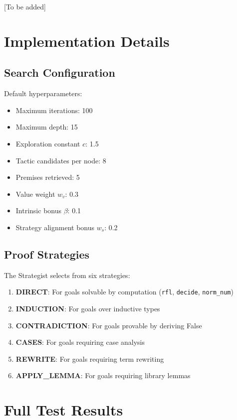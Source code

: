 \documentclass[11pt]{article}
\begin{document}
[To be added]

\appendix

\section{Implementation Details}

\subsection{Search Configuration}

Default hyperparameters:
\begin{itemize}
    \item Maximum iterations: 100
    \item Maximum depth: 15
    \item Exploration constant $c$: 1.5
    \item Tactic candidates per node: 8
    \item Premises retrieved: 5
    \item Value weight $w_v$: 0.3
    \item Intrinsic bonus $\beta$: 0.1
    \item Strategy alignment bonus $w_s$: 0.2
\end{itemize}

\subsection{Proof Strategies}

The Strategist selects from six strategies:
\begin{enumerate}
    \item \textbf{DIRECT}: For goals solvable by computation (\texttt{rfl}, \texttt{decide}, \texttt{norm\_num})
    \item \textbf{INDUCTION}: For goals over inductive types
    \item \textbf{CONTRADICTION}: For goals provable by deriving False
    \item \textbf{CASES}: For goals requiring case analysis
    \item \textbf{REWRITE}: For goals requiring term rewriting
    \item \textbf{APPLY\_LEMMA}: For goals requiring library lemmas
\end{enumerate}

\section{Full Test Results}
\end{document}
